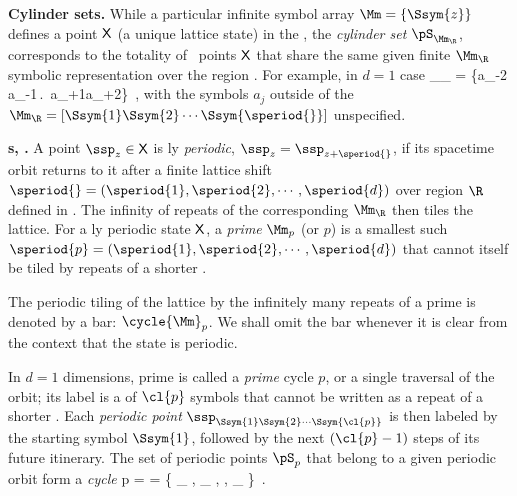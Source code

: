 {\bf Cylinder sets.}
While a particular {\admissible} infinite symbol array
\(
\Mm= \{\Ssym{z}\} %
\)
defines a point $\mathsf{X}$ (a unique lattice state) in the \statesp,
the \emph{cylinder set}
$\pS_{\Mm_{\R}}$,
corresponds to the totality  of
\statesp\ points $\mathsf{X}$ that share the same given finite {\brick} $\Mm_{\R}$
symbolic representation over the region \R. For example, in $d=1$ case
\beq
\pS_{\Mm_{\R}} =
    \{\cdots a_{-2} a_{-1}\,.\,
   \cdots \Ssym{\speriod{}}
   a_{\speriod{}+1}a_{\speriod{}+2}\cdots\}
\,,
with the symbols  $a_{j}$ outside of the {\brick}
$\Mm_{\R}=[\Ssym{1}\Ssym{2}\cdots \Ssym{\speriod{}}]$
unspecified.

{\bf \Po s, \dtors.}
A {\statesp} point $\ssp_z\in\Xx$ is {\spt}ly
{\em periodic}, $\ssp_z=\ssp_{z+\speriod{}}$, if its spacetime orbit returns to it
after a finite lattice shift
\(
\speriod{}= (\speriod{1},\speriod{2},\cdots,\speriod{d})
\)
over region $\R$ defined in .
The infinity of repeats of the corresponding {\brick} $\Mm_{\R}$ then tiles the lattice.
For a {\spt}ly {periodic} state $\mathsf{X}$, a {\em prime} {\brick}
$\Mm_{p}$ (or $p$) is a smallest such \brick\
\(
\speriod{p}= (\speriod{1},\speriod{2},\cdots,\speriod{d})
\)
that cannot itself be tiled by repeats of a shorter {\brick}.

The periodic tiling of the lattice by the infinitely many repeats of a prime
{\brick} is denoted by a bar: $\cycle{\Mm}_{p}$. We shall omit the bar whenever
it is clear from the context that the state is periodic.


In $d=1$ dimensions, prime {\brick} is called a {\em prime} cycle $p$, or a
single traversal of the orbit; its label is a {\brick} of $\cl{p}$ symbols that
cannot be written as a repeat of a shorter {\brick}.
Each {\em periodic point}
\(
      \ssp_{ \Ssym{1} \Ssym{2} \cdots \Ssym{\cl{p}}}
\)
is then labeled by the starting symbol $\Ssym{1}$, followed by
the next $(\cl{p}-1)$ steps of its future itinerary.
The set of periodic points $\pS_p$ that belong to a given periodic orbit
form a {\em cycle}
\beq
p =  
  = \{
      \ssp_{  \cdots {}},
      \ssp_{ \Ssym{2} \cdots \Ssym{\cl{p}} \Ssym{1}},
    \cdots,
      \ssp_{  \cdots {}}
     \}
\,.

